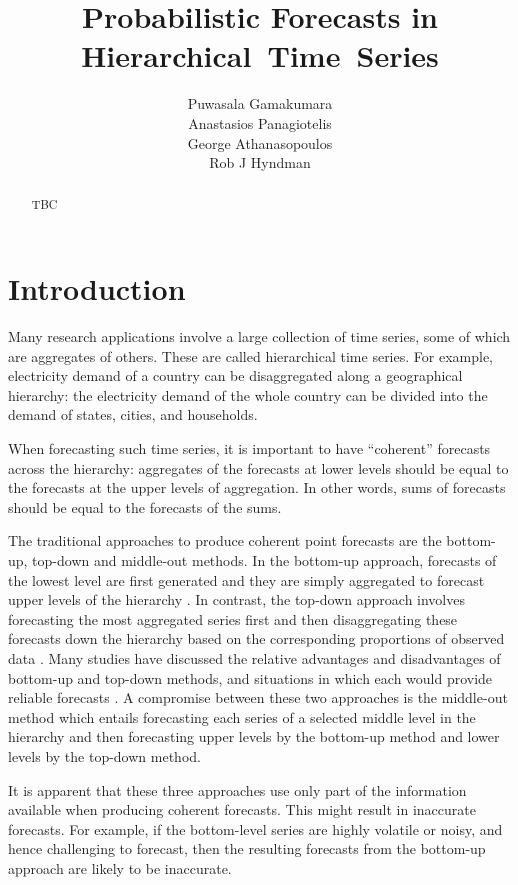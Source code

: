 \documentclass[a4paper, 11pt]{article}
\title{Probabilistic Forecasts in Hierarchical~Time~Series}
\author{Puwasala Gamakumara\\ Anastasios Panagiotelis\\ George Athanasopoulos\\ Rob J Hyndman}
\begin{document}
  
\maketitle

\begin{abstract}
  TBC
\end{abstract}


\section{Introduction}\label{sec:intro}

Many research applications involve a large collection of time series, some of which are aggregates of others. These are called hierarchical time series. For example, electricity demand of a country can be disaggregated along a geographical hierarchy: the electricity demand of the whole country can be divided into the demand of states, cities, and households. 

When forecasting such time series, it is important to have ``coherent'' forecasts across the hierarchy: aggregates of the forecasts at lower levels should be equal to the forecasts at the upper levels of aggregation. In other words, sums of forecasts should be equal to the forecasts of the sums.

The traditional approaches to produce coherent point forecasts are the bottom-up, top-down and middle-out methods. In the bottom-up approach, forecasts of the lowest level are first generated and they are simply aggregated to forecast upper levels of the hierarchy \citep{Dunn1976}. In contrast, the top-down approach involves forecasting the most aggregated series first and then disaggregating these forecasts down the hierarchy based on the corresponding proportions of observed data \citep{Gross1990}. Many studies have discussed the relative advantages and disadvantages of bottom-up and top-down methods, and situations in which each would provide reliable forecasts \citep{Schwarzkopf1988,Kahn1998, Lapide1998,Fliedner2001}. A compromise between these two approaches is the middle-out method which entails forecasting each series of a selected middle level in the hierarchy and then forecasting upper levels by the bottom-up method and lower levels by the top-down method. 

It is apparent that these three approaches use only part of the information available when producing coherent forecasts. This might result in inaccurate forecasts. For example, if the bottom-level series are highly volatile or noisy, and hence challenging to forecast, then the resulting forecasts from the bottom-up approach are likely to be inaccurate.
\end{document}
